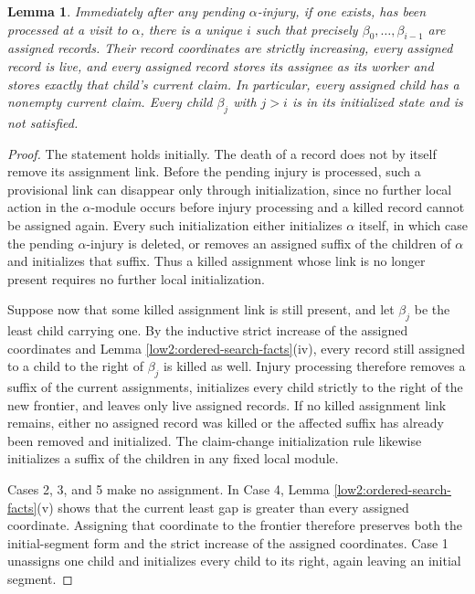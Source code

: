 \documentclass[11pt]{amsart}
\newtheorem{lemma}[theorem]{Lemma}
\begin{document}
\begin{lemma}\label{low2:frontier}
Immediately after any pending $\alpha$-injury, if one exists, has been
processed at a visit to $\alpha$, there is a unique $i$ such that precisely
$\beta_0,\ldots,\beta_{i-1}$ are assigned records. Their record coordinates
are strictly increasing, every assigned record is live, and every assigned
record stores its assignee as its worker and stores exactly that child's
current claim. In particular, every assigned child has a nonempty current
claim. Every child $\beta_j$ with $j>i$ is in its initialized state and is not
satisfied.
\end{lemma}

\begin{proof}
The statement holds initially. The death of a record does not by itself remove
its assignment link. Before the pending injury is processed, such a
provisional link can disappear only through initialization, since no further
local action in the $\alpha$-module occurs before injury processing and a
killed record cannot be assigned again. Every such initialization either
initializes $\alpha$ itself, in which case the pending $\alpha$-injury is
deleted, or removes an assigned suffix of the children of $\alpha$ and
initializes that suffix. Thus a killed assignment whose link is no longer
present requires no further local initialization.

Suppose now that some killed assignment link is still present, and let
$\beta_j$ be the least child carrying one. By the inductive strict increase of
the assigned coordinates and Lemma
\ref{low2:ordered-search-facts}(iv), every record still assigned to a child to
the right of $\beta_j$ is killed as well. Injury processing therefore removes
a suffix of the current assignments, initializes every child strictly to the
right of the new frontier, and leaves only live assigned records. If no killed
assignment link remains, either no assigned record was killed or the affected
suffix has already been removed and initialized. The claim-change
initialization rule likewise initializes a suffix of the children in any fixed
local module.

Cases 2, 3, and 5 make no assignment. In Case 4, Lemma
\ref{low2:ordered-search-facts}(v) shows that the current least gap is greater
than every assigned coordinate. Assigning that coordinate to the frontier
therefore preserves both the initial-segment form and the strict increase of
the assigned coordinates. Case 1 unassigns one child and initializes every
child to its right, again leaving an initial segment.


\end{proof}
\end{document}
